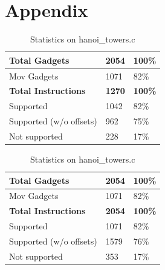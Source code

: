 \documentclass[10pt,twocolumn]{article}
\begin{document}
\section{Appendix}
\label{appendix:a}
\begin{table}[!ht]
  \centering
  
  \medskip

  \begin{tabular}{l|l|l}
    \textbf{Total Gadgets}      & \textbf{2054} & \textbf{100\%} \\ \hline
    Mov Gadgets                 & 1071          & 82\%           \\
    \textbf{Total Instructions} & \textbf{1270} & \textbf{100\%} \\ \hline
    Supported                   & 1042          & 82\%           \\ \hline
    Supported (w/o offsets)     & 962           & 75\%           \\ \hline
    Not supported               & 228           & 17\%          
  \end{tabular}%
  \label{result-fibo}
  \caption{Statistics on fibonacci.c}

  \bigskip

  
  \medskip

  \begin{tabular}{l|l|l}
    \textbf{Total Gadgets}      & \textbf{2054} & \textbf{100\%} \\ \hline
    Mov Gadgets                 & 1071          & 82\%           \\
    \textbf{Total Instructions} & \textbf{2054} & \textbf{100\%} \\ \hline
    Supported                   & 1071          & 82\%           \\ \hline
    Supported (w/o offsets)     & 1579          & 76\%           \\ \hline
    Not supported               & 353           & 17\%          
  \end{tabular}%
  \label{result-hanoi}
  \caption{Statistics on hanoi\_towers.c}
\end{table}


\end{document}

